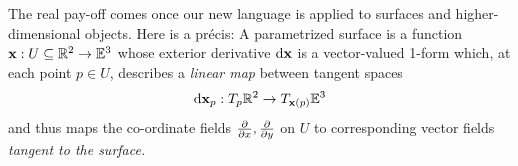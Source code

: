 The real pay-off comes once our new language is applied to surfaces and higher-dimensional objects. Here is a précis: A parametrized surface is a function ${\mathbf{x}}:U\subseteq\mathbb{R}^2\to\mathbb{E}^3$ whose exterior derivative $\mathrm{d}{\mathbf{x}}$ is a vector-valued 1-form which, at each point $p\in U$, describes a \emph{linear map} between tangent spaces
\[\mathrm{d}{\mathbf{x}}_p:T_p\mathbb{R}^2\to T_{{\mathbf{x}}(p)}\mathbb{E}^3\]
and thus maps the co-ordinate fields $\frac{\partial }{\partial x},\frac{\partial }{\partial y}$ on $U$ to corresponding vector fields \emph{tangent to the surface.}

\clearpage

% 



